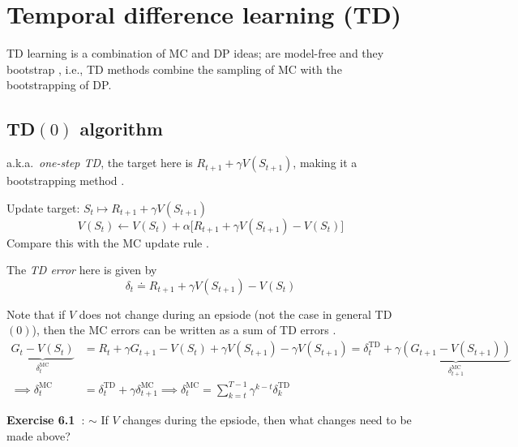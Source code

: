 \section{Temporal difference learning (TD)}

TD learning is a combination of MC and DP ideas; are model-free  and they bootstrap , i.e., TD methods combine the sampling of MC with the bootstrapping of DP.\@

\subsection{TD\texorpdfstring{\( (0) \)}{ (0) } algorithm}

a.k.a.~\textit{one-step TD}, the target here is \( R_{t+1} + \gamma V(S_{t+1}) \), making it a bootstrapping method .

Update target: \( S_t \mapsto R_{t+1} + \gamma V(S_{t+1}) \)
\begin{equation}
    V(S_t) \leftarrow V(S_t) + \alpha \Big[ R_{t+1} + \gamma V(S_{t+1}) - V(S_t) \Big]
\end{equation}
Compare this with the MC update rule .

The \textit{TD error} here is given by
\begin{equation}\label{eq:td-error-TD0}
    \delta_t \doteq R_{t+1} + \gamma V(S_{t+1}) - V(S_t)
\end{equation}

Note that if \( V \) does not change during an epsiode (not the case in general TD\( (0) \)), then the MC errors  can be written as a sum of TD errors .
\begin{align*}
    \underbrace{ G_t - V(S_t) }_{\delta_{t}^{\text{MC}}}
     & =
    R_t + \gamma G_{t+1} - V(S_t) + \gamma V(S_{t+1}) - \gamma V(S_{t+1})
    =
    \delta_{t}^{\text{TD}} + \gamma \underbrace{ (G_{t+1} - V(S_{t+1})) }_{\delta_{t+1}^{\text{MC}}}
    \\
    \implies
    \delta_{t}^{\text{MC}}
     & =
    \delta_{t}^{\text{TD}} + \gamma \delta_{t+1}^{\text{MC}}
    \implies
    \delta_{t}^{\text{MC}}
    =
    \sum_{k = t}^{T-1} \gamma^{k-t} \delta_{k}^{\text{TD}}
\end{align*}

\textbf{Exercise 6.1~\cite{Sutton1998}}:
\( \sim \) If \( V \) changes during the epsiode, then what changes need to be made above?

